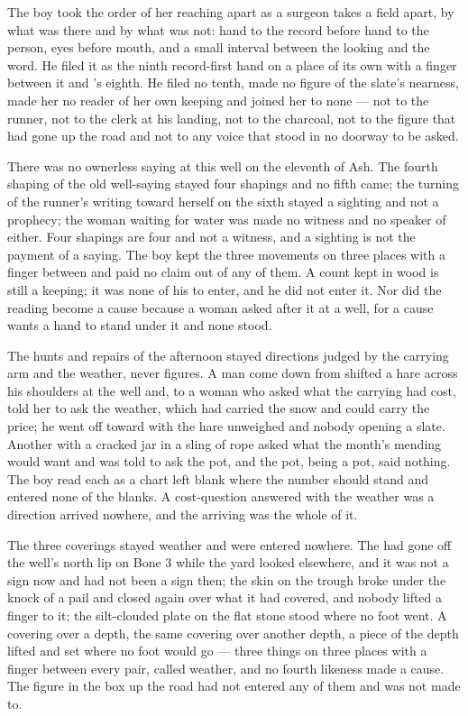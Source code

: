 The boy took the order of her reaching apart as a surgeon takes a field apart, by what was there and by what was not: hand to the record before hand to the person, eyes before mouth, and a small interval between the looking and the word. He filed it as the ninth record-first hand on a place of its own with a finger between it and 's eighth. He filed no tenth, made no figure of the slate's nearness, made her no reader of her own keeping and joined her to none --- not to the runner, not to the clerk at his landing, not to the charcoal, not to the figure that had gone up the road and not to any voice that stood in no doorway to be asked.

There was no ownerless saying at this well on the eleventh of Ash. The fourth shaping of the old well-saying stayed four shapings and no fifth came; the turning of the runner's writing toward herself on the sixth stayed a sighting and not a prophecy; the woman waiting for water was made no witness and no speaker of either. Four shapings are four and not a witness, and a sighting is not the payment of a saying. The boy kept the three movements on three places with a finger between and paid no claim out of any of them. A count kept in wood is still a keeping; it was none of his to enter, and he did not enter it. Nor did the reading become a cause because a woman asked after it at a well, for a cause wants a hand to stand under it and none stood.

\scenebreak

The hunts and repairs of the afternoon stayed directions judged by the carrying arm and the weather, never figures. A man come down from  shifted a hare across his shoulders at the well and, to a woman who asked what the carrying had cost, told her to ask the weather, which had carried the snow and could carry the price; he went off toward  with the hare unweighed and nobody opening a slate. Another with a cracked jar in a sling of rope asked what the month's mending would want and was told to ask the pot, and the pot, being a pot, said nothing. The boy read each as a chart left blank where the number should stand and entered none of the blanks. A cost-question answered with the weather was a direction arrived nowhere, and the arriving was the whole of it.

The three coverings stayed weather and were entered nowhere. The  had gone off the well's north lip on Bone 3 while the yard looked elsewhere, and it was not a sign now and had not been a sign then; the skin on the trough broke under the knock of a pail and closed again over what it had covered, and nobody lifted a finger to it; the silt-clouded plate on the flat stone stood where no foot went. A covering over a depth, the same covering over another depth, a piece of the depth lifted and set where no foot would go --- three things on three places with a finger between every pair, called weather, and no fourth likeness made a cause. The figure in the box up the road had not entered any of them and was not made to.

